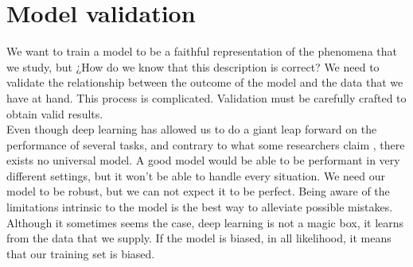 \begin{figure}[h]
  \begin{center}
  \end{center}
\end{figure}


\section{Model validation}

We want to train a model to be a faithful representation of the phenomena that we study, but ¿How do we know that this description is correct? We need to validate the relationship between the outcome of the model and the data that we have at hand. This process is complicated. Validation must be carefully crafted to obtain valid results.\\

Even though deep learning has allowed us to do a giant leap forward on the performance of several tasks, and contrary to what some researchers claim \cite{DBLP:journals/corr/KaiserGSVPJU17}, there exists no universal model. A good model would be able to be performant in very different settings, but it won't be able to handle every situation. We need our model to be robust, but we can not expect it to be perfect. Being aware of the limitations intrinsic to the model is the best way to alleviate possible mistakes. Although it sometimes seems the case, deep learning is not a magic box, it learns from the data that we supply. If the model is biased, in all likelihood, it means that our training set is biased.\\

